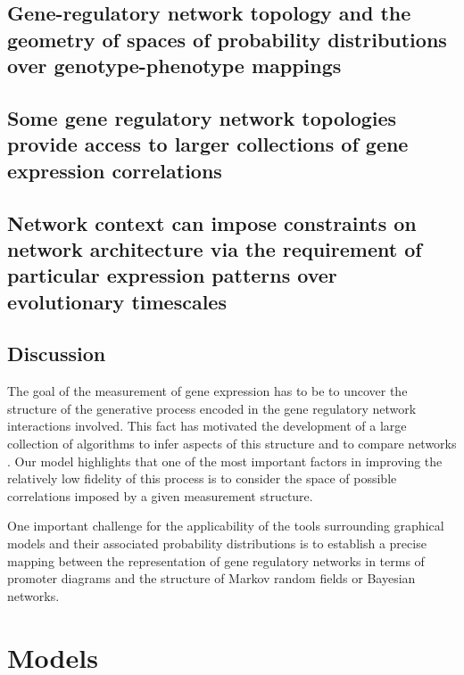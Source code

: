 \subsection*{Gene-regulatory network topology and the geometry of spaces of probability distributions over genotype-phenotype mappings}
\subsection*{Some gene regulatory network topologies provide access to larger collections of gene expression correlations}
\subsection*{Network context can impose constraints on network architecture via the requirement of particular expression patterns over evolutionary timescales}

\subsection*{Discussion}
The goal of the measurement of gene expression has to be to uncover the structure of the generative process encoded in the gene regulatory network interactions involved. This fact has motivated the development of a large collection of algorithms to infer aspects of this structure \cite{DeSmet2010} and to compare networks \cite{Ideker2012}. Our model highlights that one of the most important factors in improving the relatively low fidelity of this process is to consider the space of possible correlations imposed by a given measurement structure.

One important challenge for the applicability of the tools surrounding graphical models and their associated probability distributions is to establish a precise mapping between the representation of gene regulatory networks in terms of promoter diagrams and the structure of Markov random fields or Bayesian networks.

\section*{Models}



%

